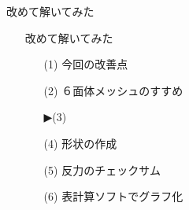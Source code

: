 \begin{frame}{改めて解いてみた}
  \begin{itemize}
      \item[] 改めて解いてみた
      \begin{itemize}[itemsep=1.3ex, leftmargin=1cm]
        \item[(1)]  {\color{cud_lightgray}今回の改善点}
	\item[(2)]  {\color{cud_lightgray}６面体メッシュのすすめ}
	\item[▶(3)]   
	\item[(4)]  {\color{cud_lightgray}形状の作成}
	\item[(5)]  {\color{cud_lightgray}反力のチェックサム}
	\item[(6)]  {\color{cud_lightgray}表計算ソフトでグラフ化}
      \end{itemize}
  \end{itemize}
\end{frame}
